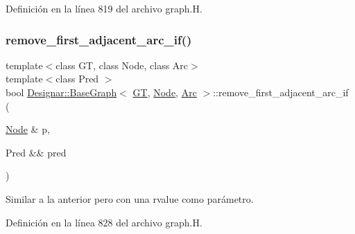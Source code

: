 Definición en la línea 819 del archivo graph.\+H.

\mbox{\label{class_designar_1_1_base_graph_abe36f7676c51362b9a0f560d3c062772}} 
\subsubsection{\texorpdfstring{remove\+\_\+first\+\_\+adjacent\+\_\+arc\+\_\+if()}{remove\_first\_adjacent\_arc\_if()}\hspace{0.1cm}{\footnotesize\ttfamily [2/2]}}
{\footnotesize\ttfamily template$<$class GT, class Node, class Arc$>$ \\
template$<$class Pred $>$ \\
bool \hyperlink{class_designar_1_1_base_graph}{Designar\+::\+Base\+Graph}$<$ \hyperlink{demo-buildgraph_8_c_a3001c40d2c31ca87ed96cd7d1334a55e}{GT}, \hyperlink{namespace_designar_a5af326c65aa2bd26b26c410f2030d09e}{Node}, \hyperlink{namespace_designar_a3f55fb5513d62ff47cbc8f72b8e95d6f}{Arc} $>$\+::remove\+\_\+first\+\_\+adjacent\+\_\+arc\+\_\+if (\begin{DoxyParamCaption}\item[{\hyperlink{namespace_designar_a5af326c65aa2bd26b26c410f2030d09e}{Node} \&}]{p,  }\item[{Pred \&\&}]{pred }\end{DoxyParamCaption})\hspace{0.3cm}{\ttfamily [inline]}}



Similar a la anterior pero con una rvalue como parámetro. 



Definición en la línea 828 del archivo graph.\+H.

\mbox{\label{class_designar_1_1_base_graph_ae45255ef62c056e76c5e5c45182e9490}} 

